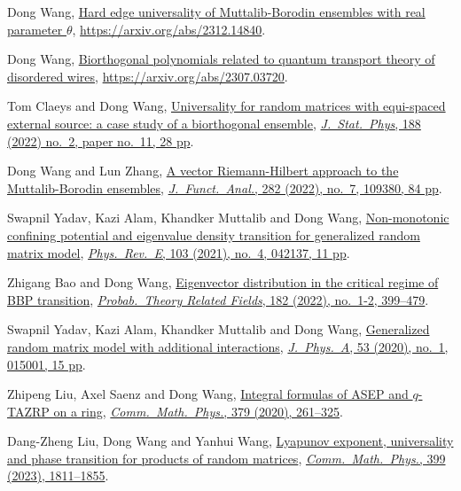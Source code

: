 \begin{etaremune}
\item
  Dong Wang, \href{https://arxiv.org/abs/2312.14840}{Hard edge universality of Muttalib-Borodin ensembles with real parameter $\theta$}, \url{https://arxiv.org/abs/2312.14840}.
\item
  Dong Wang, \href{https://arxiv.org/abs/2307.03720}{Biorthogonal polynomials related to quantum transport theory of disordered wires}, \url{https://arxiv.org/abs/2307.03720}.
\item
  Tom Claeys and Dong Wang, \href{https://arxiv.org/abs/2202.03827}{Universality for random matrices with equi-spaced external source: a case study of a biorthogonal ensemble}, \href{https://doi.org/10.1007/s10955-022-02937-z}{\textit{J.\ Stat.\ Phys}, 188 (2022) no.\ 2, paper no.\ 11, 28 pp}.
\item
  Dong Wang and Lun Zhang, \href{https://arxiv.org/abs/2103.10327}{A vector Riemann-Hilbert approach to the Muttalib-Borodin ensembles}, \href{https://doi.org/10.1016/j.jfa.2021.109380}{\textit{J.\ Funct.\ Anal.}, 282 (2022), no.\ 7, 109380, 84 pp}.
\item
  Swapnil Yadav, Kazi Alam, Khandker Muttalib and Dong Wang, \href{https://arxiv.org/abs/2010.08856}{Non-monotonic confining potential and eigenvalue density transition for generalized random matrix model}, \href{https://doi.org/10.1103/PhysRevE.103.042137}{\textit{Phys.\ Rev.\ E}, 103 (2021), no.\ 4, 042137, 11 pp}.
\item
  Zhigang Bao and Dong Wang, \href{https://arxiv.org/abs/2009.13143}{Eigenvector distribution in the critical regime of BBP transition}, \href{https://doi.org/10.1007/s00440-021-01062-4}{\textit{Probab.\ Theory  Related Fields}, 182 (2022), no.\ 1-2, 399--479}.
\item
  Swapnil Yadav, Kazi Alam, Khandker Muttalib and Dong Wang, \href{https://arxiv.org/abs/1908.03726}{Generalized random matrix model with additional interactions}, \href{https://dx.doi.org/10.1088/1751-8121/ab56e0}{\textit{J.\ Phys.\ A}, 53 (2020), no.\ 1, 015001, 15 pp}.
\item
  Zhipeng Liu, Axel Saenz and Dong Wang, \href{https://arxiv.org/abs/1905.02987}{Integral formulas of ASEP and $q$-TAZRP on a ring}, \href{https://doi.org/10.1007/s00220-020-03837-7}{\textit{Comm.\ Math.\ Phys.}, 379 (2020), 261--325}.
\item
  Dang-Zheng Liu, Dong Wang and Yanhui Wang, \href{https://arxiv.org/abs/1810.00433}{Lyapunov exponent, universality and phase transition for products of random matrices}, \href{https://doi.org/10.1007/s00220-022-04584-7}{\textit{Comm.\ Math.\ Phys.}, 399 (2023), 1811--1855}. 

\end{etaremune}
